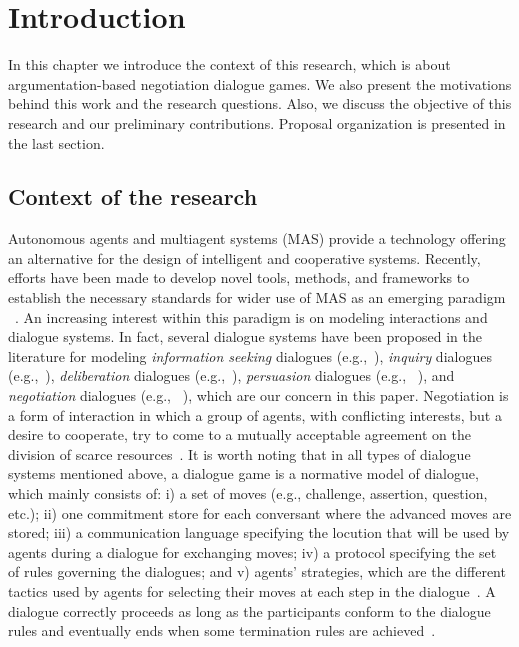 \setcounter{chapter}{1}
\section{Introduction}\label{sec:intro}
In this chapter we introduce the context of this research, which is about argumentation-based negotiation dialogue games. We also present the motivations behind this work and the research questions. Also, we discuss the objective of this research and our preliminary contributions. Proposal organization is presented in the last section.

\subsection{Context of the research}\label{sec:context}

Autonomous agents and multiagent systems (MAS) provide a technology offering an alternative for the design of intelligent and cooperative
systems. Recently, efforts have been made to develop novel tools, methods, and frameworks to establish the necessary standards for wider
use of MAS as an emerging paradigm ~\cite{Mehdi03}. An increasing interest within this paradigm is on modeling interactions and dialogue systems.
In fact, several dialogue systems have been proposed in the literature for modeling \emph{information seeking} dialogues (e.g.,~\cite{MWParsons03}),
\emph{inquiry} dialogues (e.g.,~\cite{BlackH07,Black09}), \emph{deliberation} dialogues (e.g.,~\cite{Tolchinsky2012}), \emph{persuasion}
dialogues (e.g., ~\cite{Amgoud00}), and \emph{negotiation} dialogues (e.g., ~\cite{KSycara90}), which are our concern in this paper.
Negotiation is a form of interaction in which a group of agents, with conflicting interests, but a desire to cooperate, try to come to a mutually
acceptable agreement on the division of scarce resources~\cite{Rahwan03,Bentahar07}. It is worth noting that in all types of dialogue systems
mentioned above, a dialogue game is a normative model of dialogue, which mainly consists of: i) a set of moves (e.g., challenge, assertion, question, etc.);
ii) one commitment store for each conversant where the advanced moves are stored; iii) a communication language specifying the locution that will be
used by agents during a dialogue for exchanging moves; iv) a protocol specifying the set of rules governing the dialogues; and v) agents' strategies,
which are the different tactics used by agents for selecting their moves at each step in the dialogue~\cite{AmgoudS08}. A dialogue correctly proceeds
as long as the participants conform to the dialogue rules and eventually ends when some termination rules are achieved~\cite{AmgoudS08,Nicolas03,Prakken01}.

